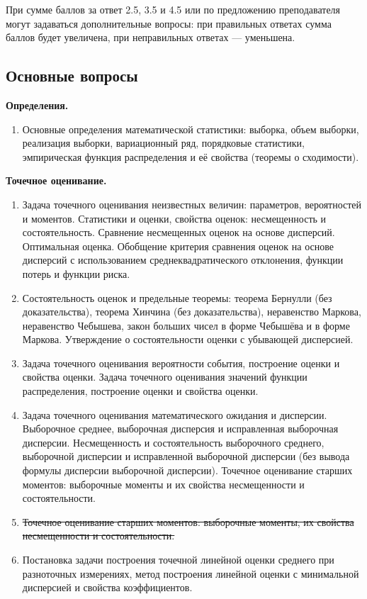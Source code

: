 \documentclass[a4paper,12pt]{article}
\newcommand{\theme}[1]{\hfil \textbf{#1} \hfil}
\begin{document}
При сумме баллов за ответ 2.5, 3.5 и 4.5 или по предложению преподавателя могут задаваться дополнительные вопросы: при правильных ответах сумма баллов будет
увеличена, при неправильных ответах --- уменьшена.

\pagebreak

\subsection{Основные вопросы}

\theme{Определения.}
\begin{enumerate}
    \item \label{def} Основные определения математической статистики: выборка, объем выборки, реализация выборки, вариационный ряд, порядковые статистики, эмпирическая функция распределения и её свойства (теоремы о сходимости).
\end{enumerate}

\theme{Точечное оценивание.}
\begin{enumerate}[resume]
    \item \label{est:pro} Задача точечного оценивания неизвестных величин: параметров, вероятностей и моментов. Статистики и оценки, свойства оценок: несмещенность и состоятельность. Сравнение несмещенных оценок на основе дисперсий. Оптимальная оценка. Обобщение критерия сравнения оценок на основе дисперсий с использованием среднеквадратического отклонения, функции потерь и функции риска.
    \item \label{est:lt} Состоятельность оценок и предельные теоремы: теорема Бернулли (без доказательства), теорема Хинчина (без доказательства), неравенство Маркова, неравенство Чебышева, закон больших чисел в форме Чебышёва и в форме Маркова. Утверждение о состоятельности оценки с убывающей дисперсией.
    \item \label{est:pt-cdf} Задача точечного оценивания вероятности события, построение оценки и свойства оценки. Задача точечного оценивания значений функции распределения, построение оценки и свойства оценки.
    \item \label{est:ev} Задача точечного оценивания математического ожидания и дисперсии. Выборочное среднее, выборочная дисперсия и исправленная выборочная дисперсии. Несмещенность и состоятельность выборочного среднего, выборочной дисперсии и исправленной выборочной дисперсии (без вывода формулы дисперсии выборочной дисперсии). Точечное оценивание старших моментов: выборочные моменты и их свойства несмещенности и состоятельности.
    \item \label{est:hom} \sout{Точечное оценивание старших моментов: выборочные моменты, их свойства несмещенности и состоятельности.}
    \item \label{est:lin} Постановка задачи построения точечной линейной оценки среднего при разноточных измерениях, метод построения линейной оценки с минимальной дисперсией и свойства коэффициентов.
\end{enumerate}
\end{document}
